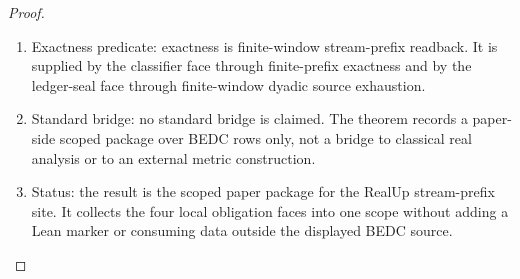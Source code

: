 \begin{proof}
\begin{enumerate}
\item Exactness predicate: exactness is finite-window stream-prefix readback.
It is supplied by the classifier face through finite-prefix exactness and by
the ledger-seal face through finite-window dyadic source exhaustion.

\item Standard bridge: no standard bridge is claimed. The theorem records a
paper-side scoped package over BEDC rows only, not a bridge to classical real
analysis or to an external metric construction.

\item Status: the result is the scoped paper package for the RealUp
stream-prefix site. It collects the four local obligation faces into one
scope without adding a Lean marker or consuming data outside the displayed
BEDC source.
\end{enumerate}
\end{proof}

